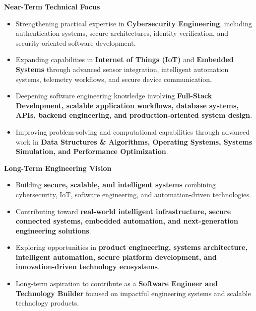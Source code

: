\documentclass[a4paper,11pt]{article}
\begin{document}
\textbf{Near-Term Technical Focus}
\begin{itemize}

    \item Strengthening practical expertise in \textbf{Cybersecurity Engineering}, including authentication systems, secure architectures, identity verification, and security-oriented software development.

    \item Expanding capabilities in \textbf{Internet of Things (IoT)} and \textbf{Embedded Systems} through advanced sensor integration, intelligent automation systems, telemetry workflows, and secure device communication.

    \item Deepening software engineering knowledge involving \textbf{Full-Stack Development, scalable application workflows, database systems, APIs, backend engineering, and production-oriented system design}.

    \item Improving problem-solving and computational capabilities through advanced work in \textbf{Data Structures \& Algorithms, Operating Systems, Systems Simulation, and Performance Optimization}.

\end{itemize}

\vspace{4pt}

\textbf{Long-Term Engineering Vision}
\begin{itemize}

    \item Building \textbf{secure, scalable, and intelligent systems} combining cybersecurity, IoT, software engineering, and automation-driven technologies.

    \item Contributing toward \textbf{real-world intelligent infrastructure, secure connected systems, embedded automation, and next-generation engineering solutions}.

    \item Exploring opportunities in \textbf{product engineering, systems architecture, intelligent automation, secure platform development, and innovation-driven technology ecosystems}.

    \item Long-term aspiration to contribute as a \textbf{Software Engineer and Technology Builder} focused on impactful engineering systems and scalable technology products.

\end{itemize}
\end{document}
